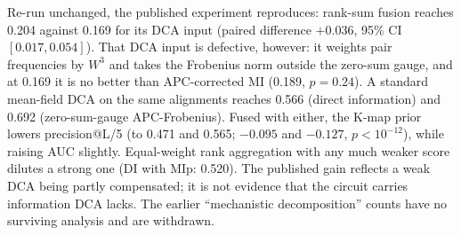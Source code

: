 Re-run unchanged, the published experiment reproduces: rank-sum fusion
reaches 0.204 against 0.169 for its DCA input (paired difference $+0.036$,
95\% CI $[0.017, 0.054]$).  That DCA input is defective, however: it weights
pair frequencies by $W^3$ and takes the Frobenius norm outside the zero-sum
gauge, and at 0.169 it is no better than APC-corrected MI (0.189, $p = 0.24$).
A standard mean-field DCA on the same alignments reaches 0.566 (direct
information) and 0.692 (zero-sum-gauge APC-Frobenius).  Fused with either, the
K-map prior lowers precision@L/5 (to 0.471 and 0.565; $-0.095$ and $-0.127$,
$p < 10^{-12}$), while raising AUC slightly.  Equal-weight rank aggregation
with any much weaker score dilutes a strong one (DI with MIp: 0.520).  The
published gain reflects a weak DCA being partly compensated; it is not
evidence that the circuit carries information DCA lacks.  The earlier
``mechanistic decomposition'' counts have no surviving analysis and are
withdrawn.

